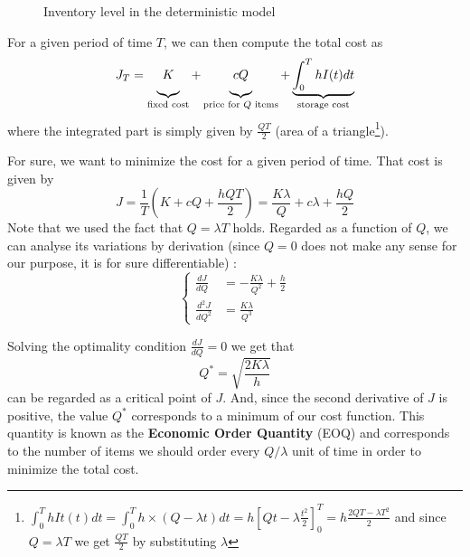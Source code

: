 \begin{figure}[h!]
    \centering
    \caption{\label{continuous:triangles}Inventory level in the deterministic model}
\end{figure}

For a given period of time $T$, we can then compute the total cost as
    \[ J_T = 
        \underbrace{\vphantom{\int}K}_{\textrm{fixed cost}}
        +
        \underbrace{\vphantom{\int}cQ}_{\textrm{price for }Q\textrm{ items}}
        +
        \underbrace{\int_0^T hI(t)dt}_\textrm{storage cost}
    \]
where the integrated part is simply given by $\frac{QT}{2}$ (area of a triangle\footnote{$\int_0^ThIt(t)dt = \int_0^T h\times (Q-\lambda t) dt = h[Qt-\lambda \frac{t^2}2 ]_0^T = h\frac{2QT-\lambda T^2}{2}$ and since $Q=\lambda T$ we get $\frac{QT}{2}$ by substituting $\lambda$}). 

For sure, we want to minimize the cost for a given period of time. That cost is given by \[ J = \frac{1}{T}\left( K + cQ + \frac{hQT}{2} \right) = \frac{K\lambda}Q + c\lambda + \frac{hQ}{2} \]
Note that we used the fact that $Q = \lambda T$ holds. Regarded as a function of $Q$, we can analyse its variations by derivation (since $Q=0$ does not make any sense for our purpose, it is for sure differentiable) : 
\[
    \begin{cases}
        \frac{dJ}{dQ} &= -\frac{K\lambda}{Q^2} + \frac{h}{2} \\
        \frac{d^2J}{dQ^2} &= \frac{K\lambda}{Q^3}
    \end{cases}
\]

Solving the optimality condition $\frac{dJ}{dQ} = 0$ we get that \[Q^* = \sqrt{ \frac{2K\lambda}{h} } \] can be regarded as a critical point of $J$. And, since the second derivative of $J$ is positive, the value $Q^*$ corresponds to a minimum of our cost function. This quantity is known as the \textbf{Economic Order Quantity} (EOQ) and corresponds to the number of items we should order every $Q/\lambda$ unit of time in order to minimize the total cost. 

